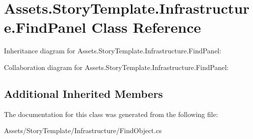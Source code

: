 \hypertarget{classAssets_1_1StoryTemplate_1_1Infrastructure_1_1FindPanel}{}\section{Assets.\+Story\+Template.\+Infrastructure.\+Find\+Panel Class Reference}
\label{classAssets_1_1StoryTemplate_1_1Infrastructure_1_1FindPanel}


Inheritance diagram for Assets.\+Story\+Template.\+Infrastructure.\+Find\+Panel\+:


Collaboration diagram for Assets.\+Story\+Template.\+Infrastructure.\+Find\+Panel\+:
\subsection*{Additional Inherited Members}


The documentation for this class was generated from the following file\+:\begin{DoxyCompactItemize}
\item 
Assets/\+Story\+Template/\+Infrastructure/Find\+Object.\+cs\end{DoxyCompactItemize}
